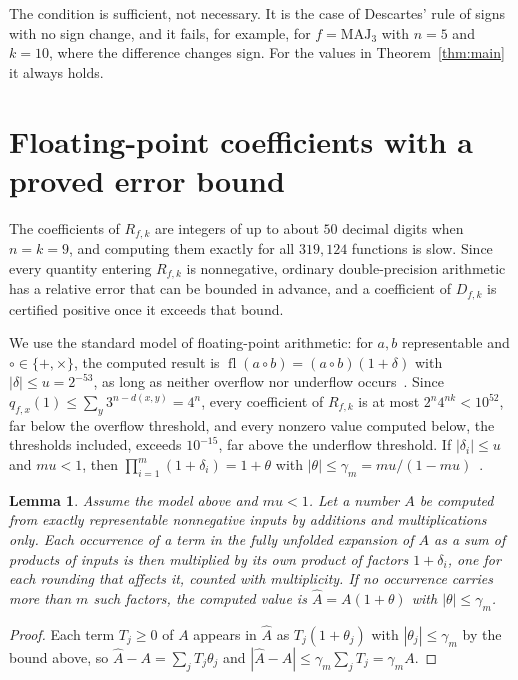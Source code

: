\documentclass[11pt]{amsart}
\newtheorem{lemma}[theorem]{Lemma}
\theoremstyle{remark}
\newcommand{\MAJ}{\mathrm{MAJ}}
\newcommand{\fl}{\operatorname{fl}}
\begin{document}
The condition is sufficient, not necessary. It is the case of Descartes' rule of signs with no sign change, and it
fails, for example, for $f=\MAJ_3$ with $n=5$ and $k=10$, where the difference changes sign. For the values in
Theorem~\ref{thm:main} it always holds.

\section{Floating-point coefficients with a proved error bound}\label{sec:float}

The coefficients of $R_{f,k}$ are integers of up to about $50$ decimal digits when $n=k=9$, and computing them
exactly for all $319{,}124$ functions is slow. Since every quantity entering $R_{f,k}$ is nonnegative, ordinary
double-precision arithmetic has a relative error that can be bounded in advance, and a coefficient of $D_{f,k}$ is
certified positive once it exceeds that bound.

We use the standard model of floating-point arithmetic: for $a,b$ representable and $\circ\in\{+,\times\}$, the computed
result is $\fl(a\circ b)=(a\circ b)(1+\delta)$ with $|\delta|\le u=2^{-53}$, as long as neither overflow
nor underflow occurs~\cite[Section~2.2]{Hig02}. Since $q_{f,x}(1)\le\sum_y3^{n-d(x,y)}=4^n$, every coefficient of $R_{f,k}$ is at
most $2^n4^{nk}<10^{52}$, far below the overflow threshold, and every nonzero value computed below, the thresholds included, exceeds
$10^{-15}$, far above the underflow threshold. If $|\delta_i|\le u$ and $mu<1$, then
$\prod_{i=1}^m(1+\delta_i)=1+\theta$ with $|\theta|\le\gamma_m=mu/(1-mu)$~\cite[Lemma~3.1]{Hig02}.

\begin{lemma}\label{lem:nonneg}
Assume the model above and $mu<1$. Let a number $A$ be computed from exactly representable nonnegative inputs by additions and multiplications only. Each
occurrence of a term in the fully unfolded expansion of $A$ as a sum of products of inputs is then multiplied by its
own product of factors $1+\delta_i$, one for each rounding that affects it, counted with multiplicity. If no occurrence
carries more than $m$ such factors, the computed value is $\hat A=A(1+\theta)$ with $|\theta|\le\gamma_m$.
\end{lemma}

\begin{proof}
Each term $T_j\ge0$ of $A$ appears in $\hat A$ as $T_j(1+\theta_j)$ with $|\theta_j|\le\gamma_m$ by the bound above,
so $\hat A-A=\sum_jT_j\theta_j$ and $|\hat A-A|\le\gamma_m\sum_jT_j=\gamma_mA$.
\end{proof}
\end{document}
